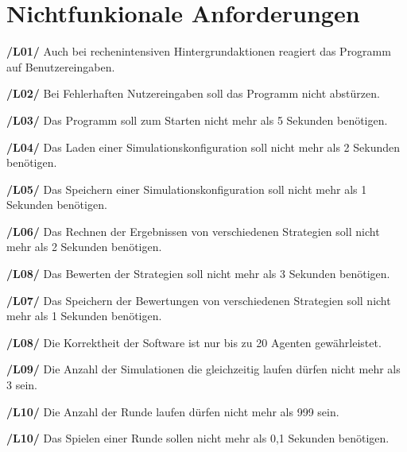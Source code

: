 \section{Nichtfunkionale Anforderungen}

\textbf{/L01/ }
Auch bei rechenintensiven Hintergrundaktionen reagiert das Programm auf Benutzereingaben.

\textbf{/L02/}
Bei Fehlerhaften Nutzereingaben soll das Programm nicht abstürzen.

\textbf{/L03/}
Das Programm soll zum Starten nicht mehr als 5 Sekunden benötigen.

\textbf{/L04/}
Das Laden einer Simulationskonfiguration soll nicht mehr als 2 Sekunden benötigen.

\textbf{/L05/}
Das Speichern einer Simulationskonfiguration soll nicht mehr als 1 Sekunden benötigen.

\textbf{/L06/}
Das Rechnen der Ergebnissen von verschiedenen Strategien soll nicht mehr als 2 Sekunden benötigen.

\textbf{/L08/}
Das Bewerten der Strategien soll nicht mehr als 3 Sekunden benötigen.

\textbf{/L07/}
Das Speichern der Bewertungen von verschiedenen Strategien soll nicht mehr als 1 Sekunden benötigen.

\textbf{/L08/}
Die Korrektheit der Software ist nur bis zu 20 Agenten gewährleistet.

\textbf{/L09/}
Die Anzahl der Simulationen die gleichzeitig laufen dürfen nicht mehr als 3 sein.

\textbf{/L10/}
Die Anzahl der Runde laufen dürfen nicht mehr als 999 sein.

\textbf{/L10/}
Das Spielen einer Runde sollen nicht mehr als 0,1 Sekunden benötigen.